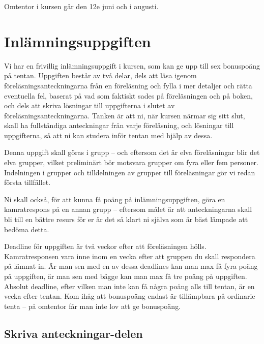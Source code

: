 \documentclass{tufte-handout}
\begin{document}
Omtentor i kursen går den 12e juni och i augusti.

\section{Inlämningsuppgiften}

Vi har en frivillig inlämningsuppgift i kursen, som kan ge upp till sex bonuspoäng på tentan. Uppgiften består av två delar, dels att läsa igenom föreläsningsanteckningarna från en föreläsning och fylla i mer detaljer och rätta eventuella fel, baserat på vad som faktiskt sades på föreläsningen och på boken, och dels att skriva lösningar till uppgifterna i slutet av föreläsningsanteckningarna. Tanken är att ni, när kursen närmar sig sitt slut, skall ha fullständiga anteckningar från varje föreläsning, och lösningar till uppgifterna, så att ni kan studera inför tentan med hjälp av dessa.

Denna uppgift skall göras i grupp -- och eftersom det är elva föreläsningar blir det elva grupper, vilket preliminärt bör motsvara grupper om fyra eller fem personer. Indelningen i grupper och tilldelningen av grupper till föreläsningar gör vi redan första tillfället.

Ni skall också, för att kunna få poäng på inlämningsuppgiften, göra en kamratrespons på en annan grupp -- eftersom målet är att anteckningarna skall bli till en bättre resurs för er är det så klart ni själva som är bäst lämpade att bedöma detta.

Deadline för uppgiften är två veckor efter att föreläsningen hölls. Kamratresponsen vara inne inom en vecka efter att gruppen du skall respondera på lämnat in. Är man sen med en av dessa deadlines kan man max få fyra poäng på uppgiften, är man sen med bägge kan man max få tre poäng på uppgiften. Absolut deadline, efter vilken man inte kan få några poäng alls till tentan, är en vecka efter tentan. Kom ihåg att bonuspoäng endast är tillämpbara på ordinarie tenta -- på omtentor får man inte lov att ge bonuspoäng.

\subsection{Skriva anteckningar-delen}
\end{document}
